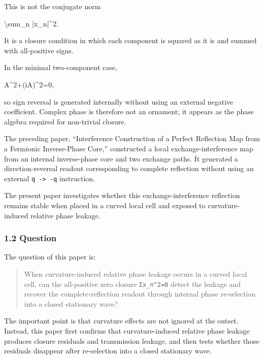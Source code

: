 \documentclass[
  a4paper,
]{article}
\newenvironment{Shaded}{}{}
\newcommand{\NormalTok}[1]{#1}
\begin{document}
This is not the conjugate norm

\begin{Shaded}
\begin{Highlighting}[]
\NormalTok{\textbackslash{}sum\_n |x\_n|\^{}2.}
\end{Highlighting}
\end{Shaded}

It is a closure condition in which each component is squared as it is
and summed with all-positive signs.

In the minimal two-component case,

\begin{Shaded}
\begin{Highlighting}[]
\NormalTok{A\^{}2+(iA)\^{}2=0,}
\end{Highlighting}
\end{Shaded}

so sign reversal is generated internally without using an external
negative coefficient. Complex phase is therefore not an ornament; it
appears as the phase algebra required for non-trivial closure.

The preceding paper, ``Interference Construction of a Perfect Reflection
Map from a Fermionic Inverse-Phase Core,'' constructed a local
exchange-interference map from an internal inverse-phase core and two
exchange paths. It generated a direction-reversal readout corresponding
to complete reflection without using an external
\texttt{q\ -\textgreater{}\ -q} instruction.

The present paper investigates whether this exchange-interference
reflection remains stable when placed in a curved local cell and exposed
to curvature-induced relative phase leakage.

\subsubsection{1.2 Question}\label{question}

The question of this paper is:

\begin{quote}
When curvature-induced relative phase leakage occurs in a curved local
cell, can the all-positive zero closure \texttt{Σx\_n\^{}2=0} detect the
leakage and recover the complete-reflection readout through internal
phase re-selection into a closed stationary wave?
\end{quote}

The important point is that curvature effects are not ignored at the
outset. Instead, this paper first confirms that curvature-induced
relative phase leakage produces closure residuals and transmission
leakage, and then tests whether those residuals disappear after
re-selection into a closed stationary wave.
\end{document}
